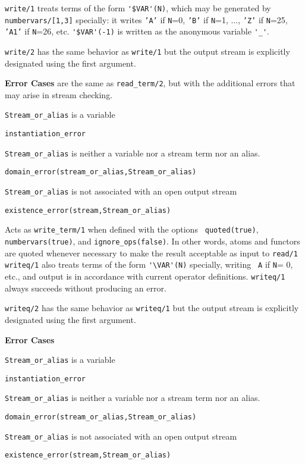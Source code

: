 \begin{description}
{\tt write/1} treats terms of the form \verb|'$VAR'(N)|, which may be
generated by {\tt numbervars/[1,3]} specially: it writes {\tt 'A'} if
{\tt N}=0, {\tt 'B'} if {\tt N}=1, $\ldots$, {\tt 'Z'} if {\tt N}=25,
{\tt 'A1'} if {\tt N}=26, etc.  \verb|'$VAR'(-1)| is written as the
anonymous variable \verb|'_'|.

	{\tt write/2} has the same behavior as {\tt write/1} but the
	output stream is explicitly designated using the first argument.

{\bf Error Cases} are the same as {\tt read\_term/2}, but with the
additional errors that may arise in stream checking.
\bi
\item 	{\tt Stream\_or\_alias} is a variable
\bi
\item {\tt instantiation\_error}
\ei
\item 	{\tt Stream\_or\_alias} is neither a variable nor a stream term nor an alias.
\bi
\item 	{\tt domain\_error(stream\_or\_alias,Stream\_or\_alias)}
\ei
\item 	{\tt Stream\_or\_alias} is not associated with an open output stream
\bi
\item 	{\tt existence\_error(stream,Stream\_or\_alias)}
\ei
\ei

%
Acts as {\tt write\_term/1} when defined with the options {\tt
  quoted(true)}, {\tt numbervars(true)}, and {\tt ignore\_ops(false)}.
In other words, atoms and functors are quoted whenever necessary to
make the result acceptable as input to {\tt read/1} {\tt writeq/1}
also treats terms of the form \verb|'\VAR'(N)| specially, writing {\tt
  A} if {\tt N}= 0, etc., and output is in accordance with current
operator definitions.  {\tt writeq/1} always succeeds without
producing an error.

%
	{\tt writeq/2} has the same behavior as {\tt writeq/1} but the
	output stream is explicitly designated using the first argument.

{\bf Error Cases} 
\bi
\item 	{\tt Stream\_or\_alias} is a variable
\bi
\item {\tt instantiation\_error}
\ei
\item 	{\tt Stream\_or\_alias} is neither a variable nor a stream term nor an alias.
\bi
\item 	{\tt domain\_error(stream\_or\_alias,Stream\_or\_alias)}
\ei
\item 	{\tt Stream\_or\_alias} is not associated with an open output stream
\bi
\item 	{\tt existence\_error(stream,Stream\_or\_alias)}
\ei
\ei


\end{description}
